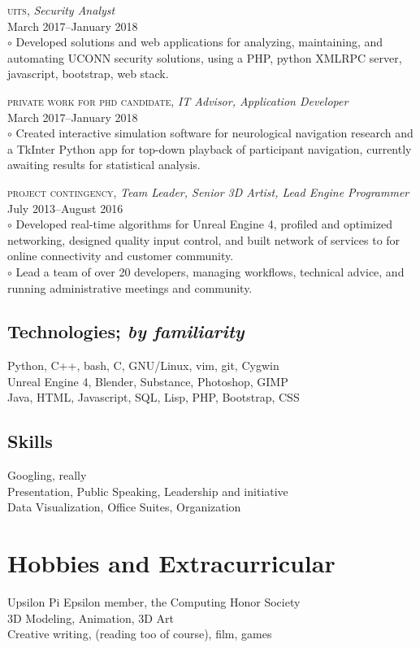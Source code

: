 \documentclass[Letterpaper,11pt]{article}
\begin{document}
    \textsc{uits}, 
    \textit{Security Analyst}\\
    March 2017--January 2018\\
        $\circ$ Developed solutions and web applications for analyzing, maintaining, and automating UCONN security solutions, using a PHP, python XMLRPC server, javascript, bootstrap, web stack.

    \textsc{private work for phd candidate}, 
    \textit{IT Advisor, Application Developer}\\
    March 2017--January 2018\\
        $\circ$ Created interactive simulation software for neurological navigation research and a TkInter Python app for top-down playback of participant navigation, currently awaiting results for statistical analysis.
        
    \textsc{project contingency}, 
    \textit{Team Leader, Senior 3D Artist, Lead Engine Programmer}\\
    July 2013--August 2016\\
        $\circ$ Developed real-time algorithms for Unreal Engine 4, profiled and optimized networking, designed quality input control, and built network of services to for online connectivity and customer community.
        \\
        $\circ$ Lead a team of over 20 developers, managing workflows, technical advice, and running administrative meetings and community.
        
\begin{multicols}{2}

    \subsection*{Technologies; \textit{by familiarity}}
    
        Python, C++, bash, C, GNU/Linux, vim, git, Cygwin
        \\
        Unreal Engine 4, Blender, Substance, Photoshop, GIMP
        \\
        Java, HTML, Javascript, SQL, Lisp, PHP, Bootstrap, CSS 
    
    \subsection*{Skills}
    
        Googling, really\\
        Presentation, Public Speaking, Leadership and initiative\\
        Data Visualization, Office Suites, Organization\\
    
\end{multicols}

\section*{Hobbies and Extracurricular}

    Upsilon Pi Epsilon member, the Computing Honor Society\\
    3D Modeling, Animation, 3D Art\\
    Creative writing, (reading too of course), film, games
    
\clearpage
\end{document}
